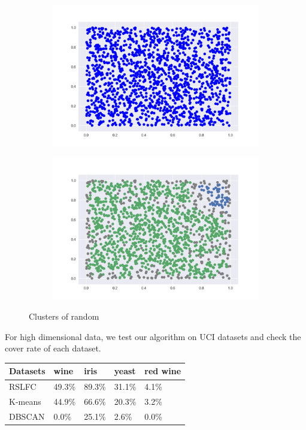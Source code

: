 \documentclass{article}
\begin{document}
\begin{figure}[h!]
	\begin{subfigure}{.5\textwidth}
		\centering
		\includegraphics[width=\linewidth]{r_figure_1.png}
		\caption{}
	\end{subfigure}%
	\begin{subfigure}{.5\textwidth}
		\centering
		\includegraphics[width=\linewidth]{r_figure_2.png}
		\caption{}
	\end{subfigure}
	\caption{Clusters of random}
\end{figure}


\newpage

For high dimensional data, we test our algorithm on UCI datasets and check the cover rate of each dataset.

\begin{center}
	\begin{tabular}{| l | l | l | l | l |}
		\hline
		Datasets & wine & iris & yeast & red wine\\ \hline
		RSLFC & 49.3\% & 89.3\% & 31.1\% & 4.1\% \\ \hline
		K-means & 44.9\% & 66.6\% & 20.3\% & 3.2\%  \\ \hline
		DBSCAN & 0.0\% & 25.1\% & 2.6\% & 0.0\%  \\ \hline
	\end{tabular}
\end{center}
\end{document}
